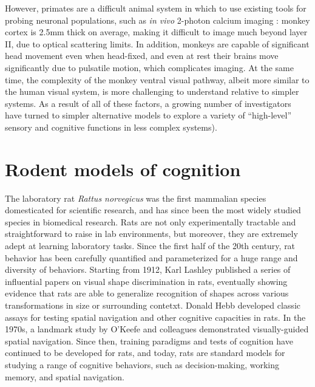 However, primates are a difficult animal system in which to use existing tools for probing neuronal populations, such as \textit{in vivo} 2-photon calcium imaging \cite{Ohki2005}: monkey cortex is 2.5mm thick on average\cite{Koo2012}, making it difficult to image much beyond layer II, due to optical scattering limits. In addition, monkeys are capable of significant head movement even when head-fixed, and even at rest their brains move significantly due to pulsatile motion, which complicates imaging. At the same time, the complexity of the monkey ventral visual pathway, albeit more similar to the human visual system, is more challenging to understand relative to simpler systems. As a result of all of these factors, a growing number of investigators have turned to simpler alternative models to explore a variety of ``high-level'' sensory and cognitive functions in less complex systems\cite{Brunton2013, Miller2017TwoStep, Aronov2014, Glickfeld2017}).


\section{Rodent models of cognition}
The laboratory rat \textit{Rattus norvegicus} was the first mammalian species domesticated for scientific research\cite{Jacob1999}, and has since been the most widely studied species in biomedical research. Rats are not only experimentally tractable and straightforward to raise in lab environments, but moreover, they are extremely adept at learning laboratory tasks. Since the first half of the 20th century, rat behavior has been carefully quantified and parameterized for a huge range and diversity of behaviors. Starting from 1912, Karl Lashley published a series of influential papers on visual shape discrimination in rats, eventually showing evidence that rats are able to generalize recognition of shapes across various transformations in size or surrounding contetxt\cite{Lashley1912, Lashley1930, Lashley1938}. Donald Hebb developed classic assays for testing spatial navigation and other cognitive capacities in rats\cite{Hebb1946}. In the 1970s, a landmark study by O'Keefe and colleagues demonstrated visually-guided spatial navigation\cite{OKeefe1971}. Since then, training paradigms and tests of cognition have continued to be developed for rats, and today, rats are standard models for studying a range of cognitive behaviors, such as decision-making\cite{Raposo2012, Miller2017TwoStep, Piet2018, Brunton2013}, working memory\cite{Bratch2016, Fassihi2014, Akrami2018}, and spatial navigation\cite{OKeefe1971, Whishaw1995, Aronov2014, Poo2020}. 

